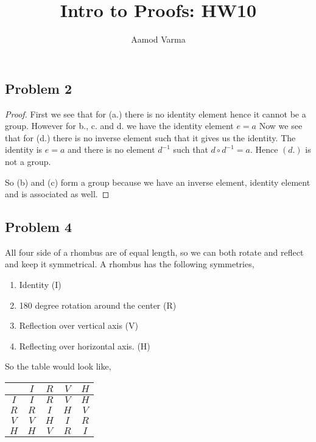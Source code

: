 \documentclass[a4paper]{report}
\title{Intro to Proofs: HW10}
\author{Aamod Varma}
\begin{document}
\maketitle
\date{}
\subsection*{Problem 2}
\begin{proof}
    First we see that for (a.) there is no identity element hence it cannot be a group. However for b., c. and d. we have the identity element $e = a$
    \vspace{1em}
    Now we see that for (d.) there is no inverse element such that it gives us the identity. The identity is $e = a$ and there is no element $d^{-1}$ such that $d \circ d^{-1} = a$. Hence $(d.)$ is not a group.

    So (b) and (c) form a group because we have an inverse element, identity element and is associated as well.
\end{proof}

\subsection*{Problem 4}
All four side of a rhombus are of equal length, so we can both rotate and reflect and keep it symmetrical. A rhombus has the following symmetries, 
\begin{enumerate}
    \item Identity (I)
    \item 180 degree rotation around the center (R)
    \item Reflection over vertical axis (V)
    \item Reflecting over horizontal axis. (H)
\end{enumerate}

So the table would look like,
\begin{center}
\begin{tabular}{|c|c|c|c|c|}
\hline
    & \(I\) & \(R\) & \(V\) & \(H\) \\ \hline
\(I\) & \(I\) & \(R\) & \(V\) & \(H\) \\ \hline
\(R\) & \(R\) & \(I\) & \(H\) & \(V\) \\ \hline
\(V\) & \(V\) & \(H\) & \(I\) & \(R\) \\ \hline
\(H\) & \(H\) & \(V\) & \(R\) & \(I\) \\ \hline
\end{tabular}
\end{center}
\end{document}
